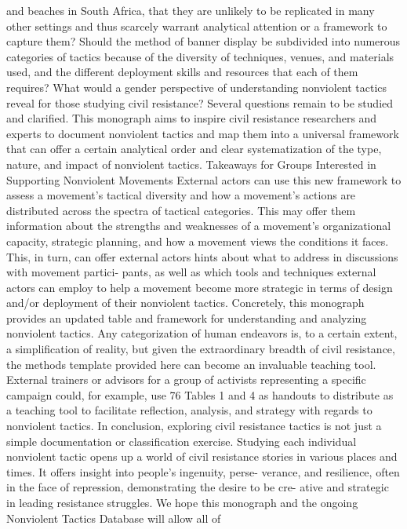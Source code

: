 \documentclass[twoside,a4paper,12pt,fleqn,openany]{extbook}
\begin{document}
and beaches in South Africa, that they are unlikely to be replicated in many other settings
and thus scarcely warrant analytical attention or a framework to capture them? Should the
method of banner display be subdivided into numerous categories of tactics because of the
diversity of techniques, venues, and materials used, and the different deployment skills and
resources that each of them requires? What would a gender perspective of understanding
nonviolent tactics reveal for those studying civil resistance? Several questions remain to be
studied and clarified.
This monograph aims to inspire civil resistance researchers and experts to document
nonviolent tactics and map them into a universal framework that can offer a certain analytical
order and clear systematization of the type, nature, and impact of nonviolent tactics.
Takeaways for Groups Interested in Supporting Nonviolent Movements
External actors can use this new framework to assess a movement’s tactical diversity and
how a movement’s actions are distributed across the spectra of tactical categories. This may
offer them information about the strengths and weaknesses of a movement’s organizational
capacity, strategic planning, and how a movement views the conditions it faces. This, in turn,
can offer external actors hints about what to address in discussions with movement partici-
pants, as well as which tools and techniques external actors can employ to help a movement
become more strategic in terms of design and/or deployment of their nonviolent tactics.
Concretely, this monograph provides an updated table and framework for understanding
and analyzing nonviolent tactics. Any categorization of human endeavors is, to a certain
extent, a simplification of reality, but given the extraordinary breadth of civil resistance, the
methods template provided here can become an invaluable teaching tool. External trainers
or advisors for a group of activists representing a specific campaign could, for example, use
76
Tables 1 and 4 as handouts to distribute as a teaching tool to facilitate reflection, analysis,
and strategy with regards to nonviolent tactics.
In conclusion, exploring civil resistance tactics is not just a simple documentation or
classification exercise. Studying each individual nonviolent tactic opens up a world of civil
resistance stories in various places and times. It offers insight into people’s ingenuity, perse-
verance, and resilience, often in the face of repression, demonstrating the desire to be cre-
ative and strategic in leading resistance struggles.
We hope this monograph and the ongoing Nonviolent Tactics Database will allow all of
\end{document}
